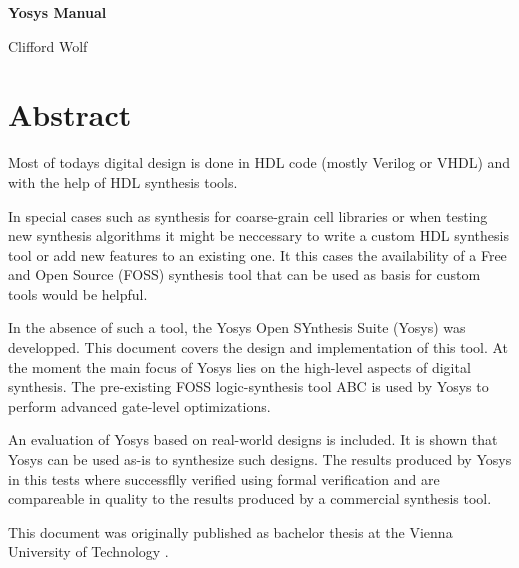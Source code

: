 \documentclass[oneside,a4paper]{book}
\begin{document}
\pagestyle{mypagestyle}

\thispagestyle{empty}
\null\vfil

\begin{center}
\bf\Huge Yosys Manual

\bigskip
\large Clifford Wolf
\end{center}

\vfil\null
\eject

\chapter*{Abstract}
Most of todays digital design is done in HDL code (mostly Verilog or VHDL) and
with the help of HDL synthesis tools.

In special cases such as synthesis for coarse-grain cell libraries or when
testing new synthesis algorithms it might be neccessary to write a custom HDL
synthesis tool or add new features to an existing one. It this cases the
availability of a Free and Open Source (FOSS) synthesis tool that can be used
as basis for custom tools would be helpful.

In the absence of such a tool, the Yosys Open SYnthesis Suite (Yosys) was
developped. This document covers the design and implementation of this tool.
At the moment the main focus of Yosys lies on the high-level aspects of
digital synthesis. The pre-existing FOSS logic-synthesis tool ABC is used
by Yosys to perform advanced gate-level optimizations.

An evaluation of Yosys based on real-world designs is included. It is shown
that Yosys can be used as-is to synthesize such designs. The results produced
by Yosys in this tests where successflly verified using formal verification
and are compareable in quality to the results produced by a commercial
synthesis tool.

\bigskip

This document was originally published as bachelor thesis at the Vienna
University of Technology \cite{BACC}.
\end{document}
